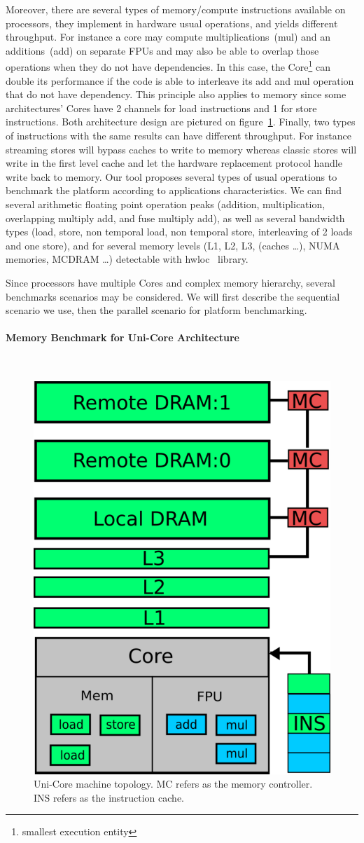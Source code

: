 \documentclass[twoside,twocolumn,8pt]{extarticle}
\begin{document}
Moreover, there are several types of memory/compute instructions available on processors, they implement in hardware usual
operations, and yields different throughput. For instance a core may compute multiplications~(mul) and an additions~(add) on
separate FPUs and may also be able to overlap those operations when they do not have dependencies. In this case, the
Core\footnote{smallest execution entity} can double its performance if the code is able to interleave its add and mul operation
that do not have dependency. This principle also applies to memory since some architectures' Cores have 2 channels for load
instructions and 1 for store instructions.
Both architecture design are pictured on figure~\ref{fig:unicore}.
Finally, two types of instructions with the same results can have different throughput.
For instance streaming stores will bypass caches to write to memory whereas classic stores will write in the first level cache and
let the hardware replacement protocol handle write back to memory.
Our tool proposes several types of usual operations to benchmark the platform according to applications characteristics.
We can find several arithmetic floating point operation peaks (addition, multiplication, overlapping multiply add, and fuse
multiply add), as well as several bandwidth types (load, store, non temporal load, non temporal store, interleaving of 2 loads and
one store), and for several memory levels (L1, L2, L3, (caches \dots), NUMA memories, MCDRAM \dots) detectable with
hwloc~\cite{6903671} library.

Since processors have multiple Cores and complex memory hierarchy, several benchmarks scenarios may be considered.
We will first describe the sequential scenario we use, then the parallel scenario for platform benchmarking.

\paragraph{Memory Benchmark for Uni-Core Architecture}\mbox{}\\

\begin{figure}
  \centering
  \includegraphics[width=.25\textwidth]{pictures/unicore}
  \caption{Uni-Core machine topology. MC refers as the memory controller. INS refers as the instruction cache.}
  \label{fig:unicore}
\end{figure}
\end{document}
